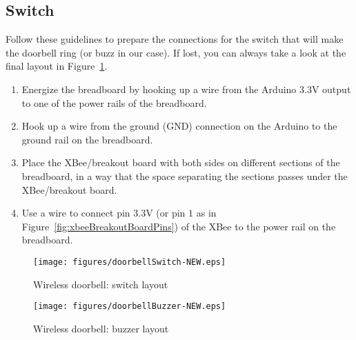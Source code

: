 \subsection{Switch}
Follow these guidelines to prepare the connections for the switch that will make the doorbell ring (or buzz in our case). If lost, you can always take a look at the final layout in Figure~\ref{fig:wirelessDoorbellSwitch}.

\begin{enumerate}
  \item Energize the breadboard by hooking up a {\color{red}{red}} wire from the Arduino $3.3$V output to one of the power rails of the breadboard.
  \item Hook up a {\color{blue}{blue}} wire from the ground (GND) connection on the Arduino to the ground rail on the breadboard.
  \item Place the XBee/breakout board with both sides on different sections of the breadboard, in a way that the space separating the sections passes under the XBee/breakout board.
  \item Use a {\color{red}{red}} wire to connect pin $3.3$V (or pin $1$ as in Figure~\ref{fig:xbeeBreakoutBoardPins}) of the XBee to the power rail on the breadboard.
\end{enumerate}


\begin{figure}[htbp]
  \centering
  \texttt{[image: figures/doorbellSwitch-NEW.eps]}
  \caption{Wireless doorbell: switch layout
  \label{fig:wirelessDoorbellSwitch}}
\end{figure}

\begin{figure}[htbp]
  \centering
  \texttt{[image: figures/doorbellBuzzer-NEW.eps]}
  \caption{Wireless doorbell: buzzer layout
  \label{fig:wirelessDoorbellBuzzer}}
\end{figure}
